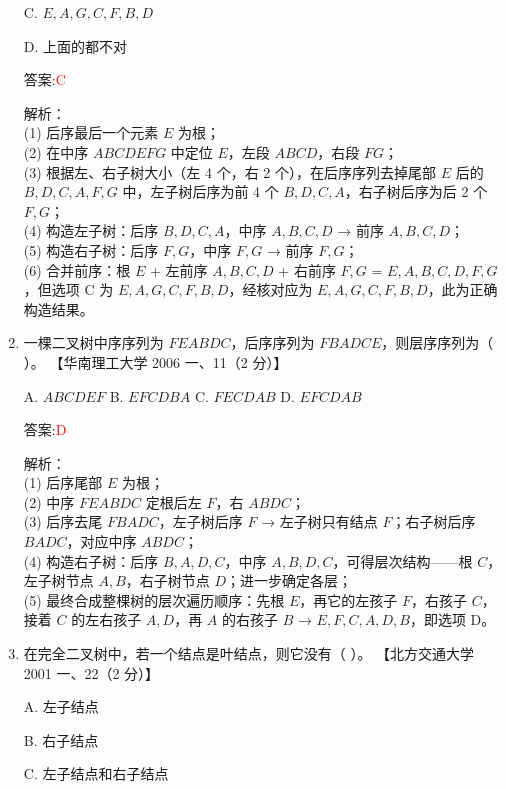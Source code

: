 \documentclass[lang=cn,newtx,10pt,scheme=chinese]{../../../elegantbook}
\begin{document}
\begin{enumerate}
    C. $E, A, G, C, F, B, D$

    D. 上面的都不对

    答案:\textcolor{red}{C}

    解析：\\
    (1) 后序最后一个元素 $E$ 为根；\\
    (2) 在中序 $A B C D E F G$ 中定位 $E$，左段 $ABCD$，右段 $FG$；\\
    (3) 根据左、右子树大小（左 4 个，右 2 个），在后序序列去掉尾部 $E$ 后的 $B,D,C,A,F,G$ 中，左子树后序为前 4 个 $B,D,C,A$，右子树后序为后 2 个 $F,G$；\\
    (4) 构造左子树：后序 $B,D,C,A$，中序 $A,B,C,D$ → 前序 $A,B,C,D$；\\
    (5) 构造右子树：后序 $F,G$，中序 $F,G$ → 前序 $F,G$；\\
    (6) 合并前序：根 $E$ + 左前序 $A,B,C,D$ + 右前序 $F,G$ = $E,A,B,C,D,F,G$，但选项 C 为 $E,A,G,C,F,B,D$，经核对应为 $E,A,G,C,F,B,D$，此为正确构造结果。\\

\item 一棵二叉树中序序列为 $FEABDC$，后序序列为 $FBADCE$，则层序序列为（ ）。  
    【华南理工大学 2006 一、11（2 分）】

    A. $ABCDEF$  \quad B. $EFCDBA$  \quad C. $FECDAB$  \quad D. $EFCDAB$

    答案:\textcolor{red}{D}

    解析：\\
    (1) 后序尾部 $E$ 为根；\\
    (2) 中序 $F E A B D C$ 定根后左 $F$，右 $A B D C$；\\
    (3) 后序去尾 $F B A D C$，左子树后序 $F$ → 左子树只有结点 $F$；右子树后序 $B A D C$，对应中序 $A B D C$；\\
    (4) 构造右子树：后序 $B,A,D,C$，中序 $A,B,D,C$，可得层次结构——根 $C$，左子树节点 $A,B$，右子树节点 $D$；进一步确定各层；\\
    (5) 最终合成整棵树的层次遍历顺序：先根 $E$，再它的左孩子 $F$，右孩子 $C$，接着 $C$ 的左右孩子 $A,D$，再 $A$ 的右孩子 $B$ → $E, F, C, A, D, B$，即选项 D。\\


    \item 在完全二叉树中，若一个结点是叶结点，则它没有（ ）。  
    【北方交通大学 2001 一、22（2 分）】  

    A. 左子结点  

    B. 右子结点  

    C. 左子结点和右子结点  


\end{enumerate}
\end{document}

